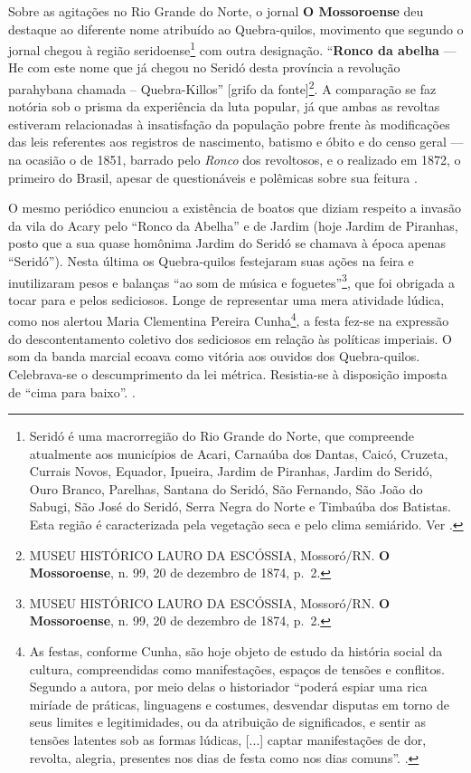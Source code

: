 \begin{refsection}
Sobre as agitações no Rio Grande do Norte, o jornal \textbf{O Mossoroense} deu destaque ao diferente nome atribuído ao Quebra-quilos, movimento que segundo o jornal chegou à região seridoense\footnote{Seridó é uma macrorregião do Rio Grande do Norte, que compreende atualmente aos municípios de Acari, Carnaúba dos Dantas, Caicó, Cruzeta, Currais Novos, Equador, Ipueira, Jardim de Piranhas, Jardim do Seridó, Ouro Branco, Parelhas, Santana do Seridó, São Fernando, São João do Sabugi, São José do Seridó, Serra Negra do Norte e Timbaúba dos Batistas. Esta região é caracterizada pela vegetação seca e pelo clima semiárido. Ver \cite{Abrantes2011}.} com outra designação. “\textbf{Ronco da abelha} --- He com este nome que já chegou no Seridó desta província a revolução parahybana chamada – Quebra-Killos” [grifo da fonte]\footnote{MUSEU HISTÓRICO LAURO DA ESCÓSSIA, Mossoró/RN. \textbf{O Mossoroense}, n. 99, 20 de dezembro de 1874, p.~2.}. A comparação se faz notória sob o prisma da experiência da luta popular, já que ambas as revoltas estiveram relacionadas à insatisfação da população pobre frente às modificações das leis referentes aos registros de nascimento, batismo e óbito e do censo geral --- na ocasião o de 1851, barrado pelo \textit{Ronco} dos revoltosos, e o realizado em 1872, o primeiro do Brasil, apesar de questionáveis e polêmicas sobre sua feitura \cite{Oliveira2005}.

O mesmo periódico enunciou a existência de boatos que diziam respeito a invasão da vila do Acary pelo “Ronco da Abelha” e de Jardim (hoje Jardim de Piranhas, posto que a sua quase homônima Jardim do Seridó se chamava à época apenas “Seridó”). Nesta última os Quebra-quilos festejaram suas ações na feira e inutilizaram pesos e balanças “ao som de música e foguetes”\footnote{MUSEU HISTÓRICO LAURO DA ESCÓSSIA, Mossoró/RN. \textbf{O Mossoroense}, n. 99, 20 de dezembro de 1874, p.~2.}, que foi obrigada a tocar para e pelos sediciosos. Longe de representar uma mera atividade lúdica, como nos alertou Maria Clementina Pereira Cunha\footnote{As festas, conforme Cunha, são hoje objeto de estudo da história social da cultura, compreendidas como manifestações, espaços de tensões e conflitos. Segundo a autora, por meio delas o historiador “poderá espiar uma rica miríade de práticas, linguagens e costumes, desvendar disputas em torno de seus limites e legitimidades, ou da atribuição de significados, e sentir as tensões latentes sob as formas lúdicas, [...] captar manifestações de dor, revolta, alegria, presentes nos dias de festa como nos dias comuns”. \cite[p.~12]{Cunha2002}.}, a festa fez-se na expressão do descontentamento coletivo dos sediciosos em relação às políticas imperiais. O som da banda marcial ecoava como vitória aos ouvidos dos Quebra-quilos. Celebrava-se o descumprimento da lei métrica. Resistia-se à disposição imposta de “cima para baixo”. \cite[p.~13]{Cunha2002}.


\end{refsection}
